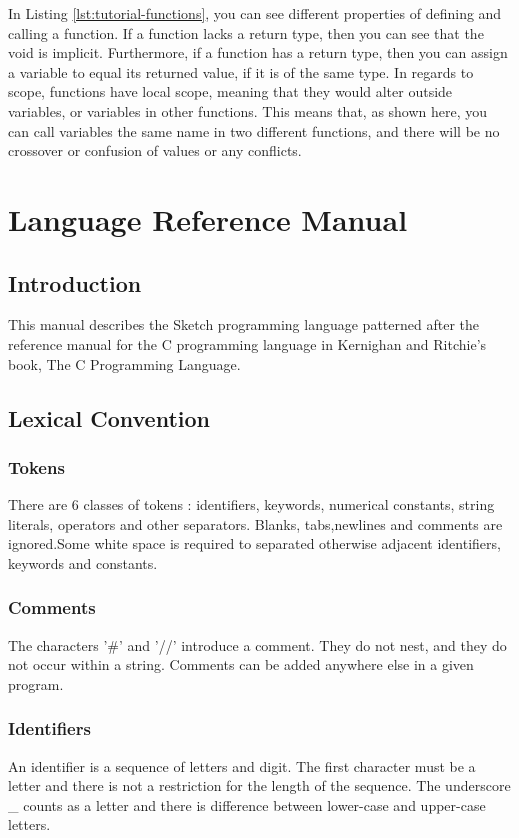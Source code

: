 \documentclass{l3proj}
\begin{document}
In Listing \ref{lst:tutorial-functions}, you can see different properties of defining and calling a function. If a function lacks a return type, then you can see that the void is implicit. Furthermore, if a function has a return type, then you can assign a variable to equal its returned value, if it is of the same type. In regards to scope, functions have local scope, meaning that they would alter outside variables, or variables in other functions. This means that, as shown here, you can call variables the same name in two different functions, and there will be no crossover or confusion of values or any conflicts.


\chapter{Language Reference Manual}
\label{manual}
\section{Introduction}
This manual describes the Sketch programming language patterned after the reference manual for the C programming language in Kernighan and Ritchie’s book, The C Programming Language.

\section{Lexical Convention}

\subsection{Tokens}
There are 6 classes of tokens : identifiers, keywords, numerical constants, string literals, operators and other separators. Blanks, tabs,newlines and comments are ignored.Some white space is required to separated otherwise adjacent identifiers, keywords and constants.  
\subsection{Comments} 
The characters '\#' and '//' introduce a comment. They do not nest, and they do not occur within a string. Comments can be added anywhere else  in a given program. 
\subsection{Identifiers}
\label{ident}
 An identifier is a sequence of letters and digit. The first character must be a letter and there is not a restriction for the length of the sequence. The underscore \_ counts as a letter and there is difference between lower-case and upper-case letters. 
\end{document}

